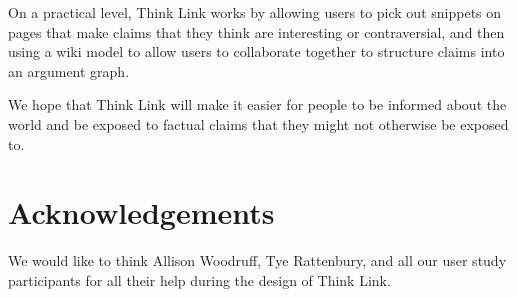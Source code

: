 \documentclass{chi2009}
\begin{document}
On a practical level, Think Link works by allowing users to pick out snippets on pages that make claims that they think are interesting or contraversial, and then using a wiki model to allow users to collaborate together to structure claims into an argument graph.

We hope that Think Link will make it easier for people to be informed about the world and be exposed to factual claims that they might not otherwise be exposed to.

\section{Acknowledgements}

We would like to think Allison Woodruff, Tye Rattenbury, and all our user study participants for all their help during the design of Think Link.




\end{document}
